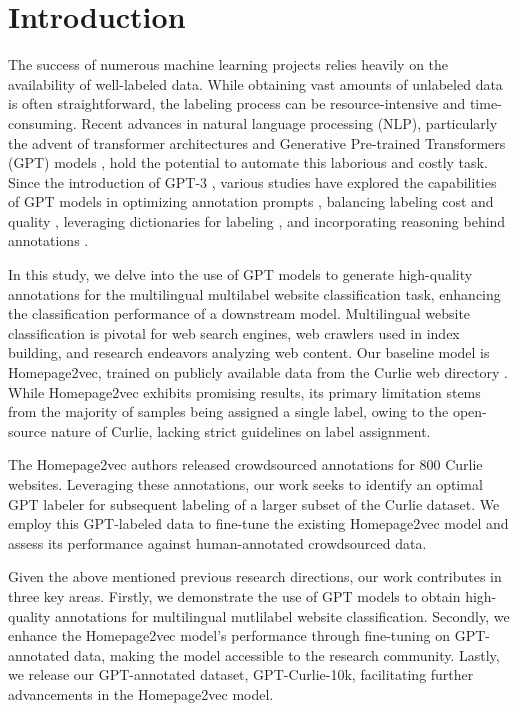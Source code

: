 \section{Introduction}
The success of numerous machine learning projects relies heavily on the availability of well-labeled data. While obtaining vast amounts of unlabeled data is often straightforward, the labeling process can be resource-intensive and time-consuming. Recent advances in natural language processing (NLP), particularly the advent of transformer architectures \cite{transformers} and Generative Pre-trained Transformers (GPT) models \cite{gpt3, gpt4}, hold the potential to automate this laborious and costly task. Since the introduction of GPT-3 \cite{gpt3}, various studies have explored the capabilities of GPT models in optimizing annotation prompts \cite{prompt-tuning}, balancing labeling cost and quality \cite{reduce-labeling-cost}, leveraging dictionaries for labeling \cite{is-gpt3-good-annot}, and incorporating reasoning behind annotations \cite{annollm}.

In this study, we delve into the use of GPT models to generate high-quality annotations for the multilingual multilabel website classification task, enhancing the classification performance of a downstream model. Multilingual website classification is pivotal for web search engines, web crawlers used in index building, and research endeavors analyzing web content. Our baseline model is Homepage2vec, trained on publicly available data from the Curlie web directory \cite{homepage2vec}. While Homepage2vec exhibits promising results, its primary limitation stems from the majority of samples being assigned a single label, owing to the open-source nature of Curlie, lacking strict guidelines on label assignment.

The Homepage2vec authors released crowdsourced annotations for 800 Curlie websites. Leveraging these annotations, our work seeks to identify an optimal GPT labeler for subsequent labeling of a larger subset of the Curlie dataset. We employ this GPT-labeled data to fine-tune the existing Homepage2vec model and assess its performance against human-annotated crowdsourced data.

Given the above mentioned previous research directions, our work contributes in three key areas. Firstly, we demonstrate the use of GPT models to obtain high-quality annotations for multilingual mutlilabel website classification. Secondly, we enhance the Homepage2vec model's performance through fine-tuning on GPT-annotated data, making the model accessible to the research community. Lastly, we release our GPT-annotated dataset, GPT-Curlie-10k, facilitating further advancements in the Homepage2vec model.
